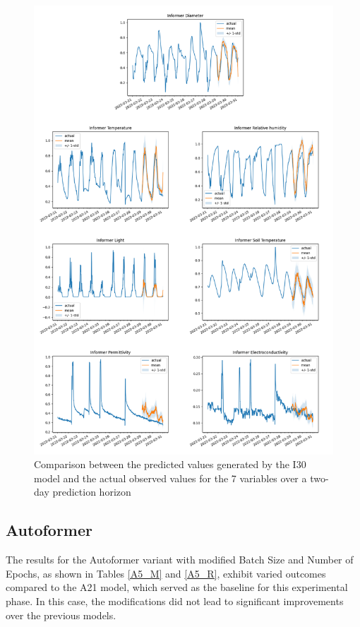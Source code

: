 \begin{figure}[htbp]
    \centering
    \includegraphics[width=15 cm]{6_ChapterResults/figuras/I30.png}
    \caption{Comparison between the predicted values generated by the I30 model and the actual observed values for the 7 variables over a two-day prediction horizon}
    \label{I30}
\end{figure}

\subsection{Autoformer}
The results for the Autoformer variant with modified Batch Size and Number of Epochs, as shown in Tables \ref{A5_M} and \ref{A5_R}, exhibit varied outcomes compared to the A21 model, which served as the baseline for this experimental phase. In this case, the modifications did not lead to significant improvements over the previous models.

